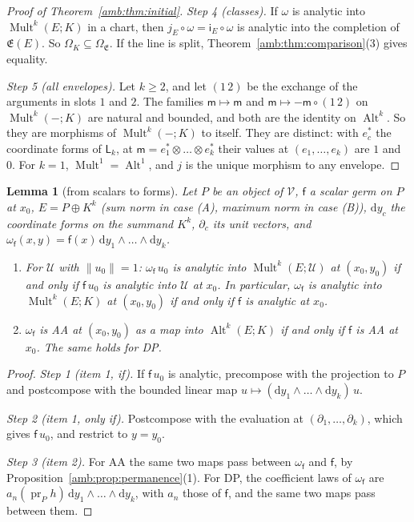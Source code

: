 \documentclass[11pt]{amsart}
\newtheorem{lemma}[theorem]{Lemma}
\theoremstyle{definition}
\theoremstyle{remark}
\numberwithin{equation}{section}
\newcommand{\Alt}{\operatorname{Alt}}
\newcommand{\Mult}{\operatorname{Mult}}
\newcommand{\norm}[1]{\lVert #1\rVert}
\theoremstyle{plain}
\theoremstyle{definition}
\theoremstyle{plain}
\begin{document}
\begin{proof}[Proof of Theorem~\ref{amb:thm:initial}]
\emph{Step 4 (classes).} If $\omega$ is analytic into $\Mult^k(E;K)$ in a chart, then $j_E\circ\omega=\mathsf i_E\circ\omega$ is analytic into the completion of $\mathfrak E(E)$. So $\Omega_K\subseteq\Omega_{\mathfrak E}$. If the line is split, Theorem~\ref{amb:thm:comparison}(3) gives equality.

\emph{Step 5 (all envelopes).} Let $k\ge2$, and let $(1\,2)$ be the exchange of the arguments in slots $1$ and $2$. The families $\mathsf m\mapsto\mathsf m$ and $\mathsf m\mapsto-\mathsf m\circ(1\,2)$ on $\Mult^k(-;K)$ are natural and bounded, and both are the identity on $\Alt^k$. So they are morphisms of $\Mult^k(-;K)$ to itself. They are distinct: with $e^*_c$ the coordinate forms of $\mathsf L_k$, at $\mathsf m=e_1^*\otimes\dots\otimes e_k^*$ their values at $(e_1,\dots,e_k)$ are $1$ and $0$. For $k=1$, $\Mult^1=\Alt^1$, and $j$ is the unique morphism to any envelope.
\end{proof}

\begin{lemma}[from scalars to forms]\label{amb:lem:scalars}
Let $P$ be an object of $\mathcal V$, $\mathsf f$ a scalar germ on $P$ at $x_0$, $E=P\oplus K^k$ \textup{(}sum norm in case \textup{(A)}, maximum norm in case \textup{(B)}\textup{)}, $\mathrm dy_c$ the coordinate forms on the summand $K^k$, $\partial_c$ its unit vectors, and $\omega_{\mathsf f}(x,y)=\mathsf f(x)\,\mathrm dy_1\wedge\dots\wedge\mathrm dy_k$.
\begin{enumerate}
\item For $\mathcal U$ with $\norm{u_0}=1$: $\omega_{\mathsf f}\,u_0$ is analytic into $\Mult^k(E;\mathcal U)$ at $(x_0,y_0)$ if and only if $\mathsf f\,u_0$ is analytic into $\mathcal U$ at $x_0$. In particular, $\omega_{\mathsf f}$ is analytic into $\Mult^k(E;K)$ at $(x_0,y_0)$ if and only if $\mathsf f$ is analytic at $x_0$.
\item $\omega_{\mathsf f}$ is AA at $(x_0,y_0)$ as a map into $\Alt^k(E;K)$ if and only if $\mathsf f$ is AA at $x_0$. The same holds for DP.
\end{enumerate}
\end{lemma}

\begin{proof}
\emph{Step 1 (item 1, if).} If $\mathsf f\,u_0$ is analytic, precompose with the projection to $P$ and postcompose with the bounded linear map $u\mapsto(\mathrm dy_1\wedge\dots\wedge\mathrm dy_k)\,u$.

\emph{Step 2 (item 1, only if).} Postcompose with the evaluation at $(\partial_1,\dots,\partial_k)$, which gives $\mathsf f\,u_0$, and restrict to $y=y_0$.

\emph{Step 3 (item 2).} For AA the same two maps pass between $\omega_{\mathsf f}$ and $\mathsf f$, by Proposition~\ref{amb:prop:permanence}(1). For DP, the coefficient laws of $\omega_{\mathsf f}$ are $a_n(\operatorname{pr}_Ph)\,\mathrm dy_1\wedge\dots\wedge\mathrm dy_k$, with $a_n$ those of $\mathsf f$, and the same two maps pass between them.
\end{proof}
\end{document}
